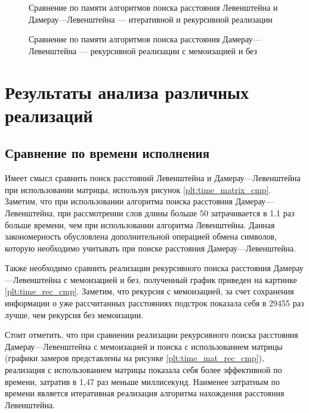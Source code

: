 \begin{figure}[H]
	\centering
	
	\caption{Сравнение по памяти алгоритмов поиска расстояния Левенштейна и Дамерау---Левенштейна --- итеративной и рекурсивной реализации}
	\label{plt:memory_mat_rec}
\end{figure}



\begin{figure}[H]
	\centering
	
	\caption{Сравнение по памяти алгоритмов поиска расстояния Дамерау---Левенштейна --- рекурсивной реализации с мемоизацией и без}
	\label{plt:memory_rec}
\end{figure}

\clearpage

\section{Результаты анализа различных реализаций}

\subsection{Сравнение по времени исполнения}
Имеет смысл сравнить поиск расстояний Левенштейна и Дамерау---Левенштейна при использовании матрицы, используя рисунок
\ref{plt:time_matrix_cmp}. Заметим, что при использовании
алгоритма поиска расстояния Дамерау---Левенштейна, при рассмотрении слов длины больше 50 затрачивается в 1.1 раз больше времени, чем 
при использовании алгоритма Левенштейна. Данная закономерность обусловлена дополнительной операцией обмена символов, которую 
необходимо учитывать при поиске расстояния Дамерау---Левенштейна.

Также необходимо сравнить реализации рекурсивного поиска расстояния Дамерау---Левенштейна с мемоизацией и без, полученный график приведен
на картинке \ref{plt:time_rec_cmp}. Заметим, что рекурсия с мемоизацией, за счет сохранения информации о уже рассчитанных расстояниях подстрок
показала себя в 29455 раз лучше, чем рекурсия без мемоизации. 

Стоит отметить, что при сравнении реализации рекурсивного поиска расстояния Дамерау---Левенштейна с  мемоизацией и поиска
с использованием матрицы (графики замеров представлены на рисунке \ref{plt:time_mat_rec_cmp}), реализация с использованием матрицы показала себя более эффективной
по времени, затратив в 1,47 раз меньше миллисекунд. 
Наименее затратным по времени является итеративная реализация  алгоритма нахождения расстояния Левенштейна.

